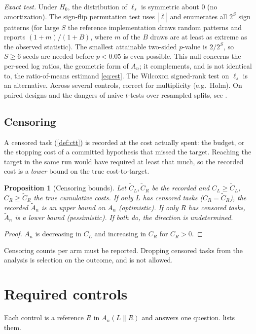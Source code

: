 \documentclass[11pt]{article}
\newtheorem{proposition}{Proposition}
\theoremstyle{remark}
\begin{document}
\emph{Exact test.} Under $H_0$, the distribution of $\ell_s$ is symmetric about $0$ (no amortization). The sign-flip permutation test uses $|\bar\ell|$ and enumerates all $2^S$ sign patterns (for large $S$ the reference implementation draws random patterns and reports $(1+m)/(1+B)$, where $m$ of the $B$ draws are at least as extreme as the observed statistic). The smallest attainable two-sided $p$-value is $2/2^S$, so $S\ge 6$ seeds are needed before $p<0.05$ is even possible. This null concerns the per-seed log ratios, the geometric form of $A_n$; it complements, and is not identical to, the ratio-of-means estimand \eqref{eq:est}.
The Wilcoxon signed-rank test on $\ell_s$ is an alternative.
Across several controls, correct for multiplicity (e.g.\ Holm).
On paired designs and the dangers of naive $t$-tests over resampled splits, see \citet{dietterich1998approximate}.

\subsection{Censoring}\label{sec:cens}
A censored task (\cref{def:ctt}) is recorded at the cost actually spent: the budget, or the stopping cost of a committed hypothesis that missed the target. Reaching the target in the same run would have required at least that much, so the recorded cost is a \emph{lower} bound on the true cost-to-target.
\begin{proposition}[Censoring bounds]\label{prop:cens}
Let $\tilde C_L,\tilde C_R$ be the recorded and $C_L\ge\tilde C_L$, $C_R\ge\tilde C_R$ the true cumulative costs.
If only $L$ has censored tasks ($C_R=\tilde C_R$), the recorded $\tilde A_n$ is an \emph{upper} bound on $A_n$ (optimistic).
If only $R$ has censored tasks, $\tilde A_n$ is a \emph{lower} bound (pessimistic).
If both do, the direction is undetermined.
\end{proposition}
\begin{proof}
$A_n$ is decreasing in $C_L$ and increasing in $C_R$ for $C_R>0$.
\end{proof}
Censoring counts per arm must be reported.
Dropping censored tasks from the analysis is selection on the outcome, and is not allowed.

\section{Required controls}\label{sec:controls}

Each control is a reference $R$ in $A_n(L\|R)$ and answers one question.  lists them.
\end{document}
